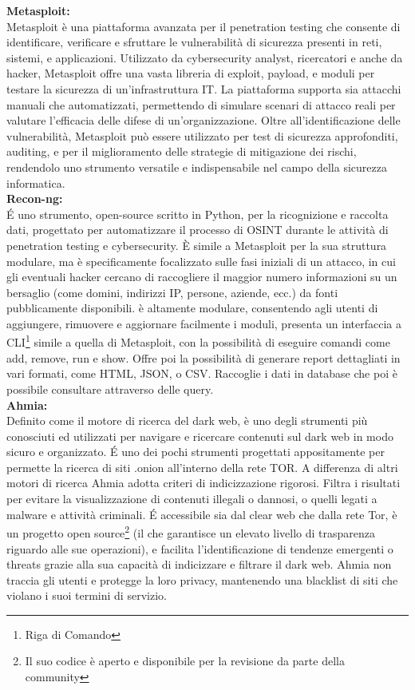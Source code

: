 \textbf{Metasploit:}\\
Metasploit è una piattaforma avanzata per il penetration testing che consente di identificare, verificare e sfruttare le vulnerabilità di sicurezza presenti in reti, sistemi, e applicazioni. Utilizzato da cybersecurity analyst, ricercatori e anche da hacker, Metasploit offre una vasta libreria di exploit, payload, e moduli per testare la sicurezza di un'infrastruttura IT. La piattaforma supporta sia attacchi manuali che automatizzati, permettendo di simulare scenari di attacco reali per valutare l'efficacia delle difese di un'organizzazione. Oltre all'identificazione delle vulnerabilità, Metasploit può essere utilizzato per test di sicurezza approfonditi, auditing, e per il miglioramento delle strategie di mitigazione dei rischi, rendendolo uno strumento versatile e indispensabile nel campo della sicurezza informatica.\\


\textbf{Recon-ng:}\\
\'E uno strumento, open-source scritto in Python, per la ricognizione e raccolta dati, progettato per automatizzare il processo di OSINT durante le attività di penetration testing e cybersecurity. È simile a Metasploit per la sua struttura modulare, ma è specificamente focalizzato sulle fasi iniziali di un attacco, in cui gli eventuali hacker cercano di raccogliere il maggior numero informazioni su un bersaglio (come domini, indirizzi IP, persone, aziende, ecc.) da fonti pubblicamente disponibili.
è altamente modulare, consentendo agli utenti di aggiungere, rimuovere e aggiornare facilmente i moduli, presenta un interfaccia a CLI\footnote{Riga di Comando} simile a quella di Metasploit, con la possibilità di eseguire comandi come add, remove, run e show. Offre poi la possibilità di generare report dettagliati in vari formati, come HTML, JSON, o CSV. Raccoglie i dati in database che poi è possibile consultare attraverso delle query.\\


\textbf{Ahmia:}\\
Definito come il motore di ricerca del dark web, è uno degli strumenti più conosciuti ed utilizzati per navigare e ricercare contenuti sul dark web in modo sicuro e organizzato. \'E uno dei pochi strumenti progettati appositamente per permette la ricerca di siti .onion all'interno della rete TOR. A differenza di altri motori di ricerca Ahmia adotta criteri di indicizzazione rigorosi. Filtra i risultati per evitare la visualizzazione di contenuti illegali o dannosi, o quelli legati a malware e attività criminali.
\'E accessibile sia dal clear web che dalla rete Tor, è un progetto open source\footnote{Il suo codice è aperto e disponibile per la revisione da parte della community} (il che garantisce un elevato livello di trasparenza riguardo alle sue operazioni), e facilita l'identificazione di tendenze emergenti o threats grazie alla sua capacità di indicizzare e filtrare il dark web.
Ahmia non traccia gli utenti e protegge la loro privacy, mantenendo una blacklist di siti che violano i suoi termini di servizio.\\


